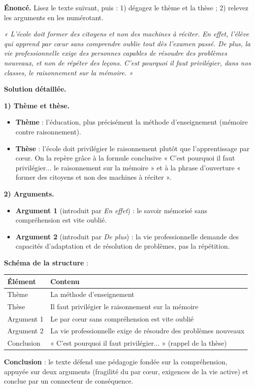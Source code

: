 \documentclass[11pt]{article}
\begin{document}
\begin{exoresolu}
\textbf{Énoncé.} Lisez le texte suivant, puis : 1) dégagez le thème et la thèse ; 2) relevez les arguments en les numérotant.

\emph{« L'école doit former des citoyens et non des machines à réciter. En effet, l'élève qui apprend par cœur sans comprendre oublie tout dès l'examen passé. De plus, la vie professionnelle exige des personnes capables de résoudre des problèmes nouveaux, et non de répéter des leçons. C'est pourquoi il faut privilégier, dans nos classes, le raisonnement sur la mémoire. »}

\tcblower
\textbf{Solution détaillée.}

\textbf{1) Thème et thèse.}
\begin{itemize}
\item \textbf{Thème} : l'éducation, plus précisément la méthode d'enseignement (mémoire contre raisonnement).
\item \textbf{Thèse} : l'école doit privilégier le raisonnement plutôt que l'apprentissage par cœur. On la repère grâce à la formule conclusive « C'est pourquoi il faut privilégier... le raisonnement sur la mémoire » et à la phrase d'ouverture « former des citoyens et non des machines à réciter ».
\end{itemize}

\textbf{2) Arguments.}
\begin{itemize}
\item \textbf{Argument 1} (introduit par \emph{En effet}) : le savoir mémorisé sans compréhension est vite oublié.
\item \textbf{Argument 2} (introduit par \emph{De plus}) : la vie professionnelle demande des capacités d'adaptation et de résolution de problèmes, pas la répétition.
\end{itemize}

\textbf{Schéma de la structure} :
\begin{center}
\begin{tabularx}{\linewidth}{|l|X|}\hline
\rowcolor{popblueL} Élément & Contenu \\ \hline
Thème & La méthode d'enseignement \\ \hline
Thèse & Il faut privilégier le raisonnement sur la mémoire \\ \hline
Argument 1 & Le par cœur sans compréhension est vite oublié \\ \hline
Argument 2 & La vie professionnelle exige de résoudre des problèmes nouveaux \\ \hline
Conclusion & « C'est pourquoi il faut privilégier... » (rappel de la thèse) \\ \hline
\end{tabularx}
\end{center}

\textbf{Conclusion} : le texte défend une pédagogie fondée sur la compréhension, appuyée sur deux arguments (fragilité du par cœur, exigences de la vie active) et conclue par un connecteur de conséquence.
\end{exoresolu}
\end{document}
